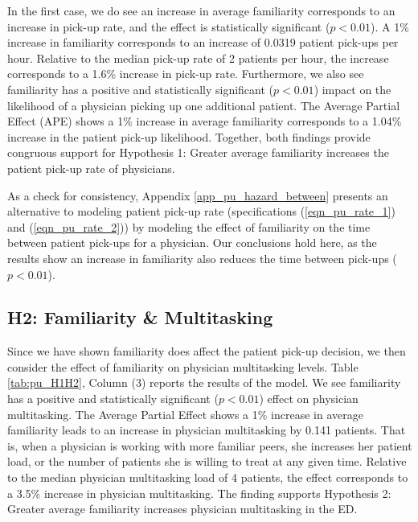  In the first case, we do see an increase in average familiarity corresponds to an increase in pick-up rate, and the effect is statistically significant ($p < 0.01$). A 1\% increase in familiarity corresponds to an increase of 0.0319 patient pick-ups per hour. Relative to the median pick-up rate of 2 patients per hour, the increase corresponds to a 1.6\% increase in pick-up rate. Furthermore, we also see familiarity has a positive and statistically significant ($p < 0.01$) impact on the likelihood of a physician picking up one additional patient. The Average Partial Effect (APE) shows a 1\% increase in average familiarity corresponds to a 1.04\% increase in the patient pick-up likelihood. Together, both findings provide congruous support for Hypothesis 1: Greater average familiarity increases the patient pick-up rate of physicians.
 
 As a check for consistency, Appendix \ref{app_pu_hazard_between} presents an alternative to modeling patient pick-up rate (specifications (\ref{eqn_pu_rate_1}) and (\ref{eqn_pu_rate_2})) by modeling the effect of familiarity on the time between patient pick-ups for a physician. Our conclusions hold here, as the results show an increase in familiarity also reduces the time between pick-ups ($p < 0.01$).
 
 \subsection{H2: Familiarity \& Multitasking}
 Since we have shown familiarity does affect the patient pick-up decision, we then consider the effect of familiarity on physician multitasking levels. Table \ref{tab:pu_H1H2}, Column (3) reports the results of the model. We see familiarity has a positive and statistically significant ($p < 0.01$) effect on physician multitasking. The Average Partial Effect shows a 1\% increase in average familiarity leads to an increase in physician multitasking by 0.141 patients. That is, when a physician is working with more familiar peers, she increases her patient load, or the number of patients she is willing to treat at any given time. Relative to the median physician multitasking load of 4 patients, the effect corresponds to a 3.5\% increase in physician multitasking. The finding supports Hypothesis 2: Greater average familiarity increases physician multitasking in the ED.
 
